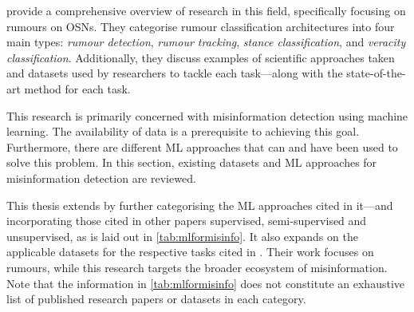   provide a comprehensive overview of research in this field, specifically focusing on rumours on \acp{OSN}. They categorise rumour classification architectures into four main types: \emph{rumour detection}, \emph{rumour tracking}, \emph{stance classification}, and \emph{veracity classification}. Additionally, they discuss examples of scientific approaches taken and datasets used by researchers to tackle each task—along with the state-of-the-art method for each task.

This research is primarily concerned with misinformation detection using machine learning. The availability of data is a prerequisite to achieving this goal. Furthermore, there are different \ac{ML} approaches that can and have been used to solve this problem. In this section, existing datasets and \ac{ML} approaches for misinformation detection are reviewed.

This thesis extends  by further categorising the \ac{ML} approaches cited in it—and incorporating those cited in other papers supervised, semi-supervised and unsupervised, as is laid out in \autoref{tab:mlformisinfo}. It also expands on the applicable datasets for the respective tasks cited in . Their work focuses on rumours, while this research targets the broader ecosystem of misinformation. Note that the information in \autoref{tab:mlformisinfo} does not constitute an exhaustive list of published research papers or datasets in each category.

